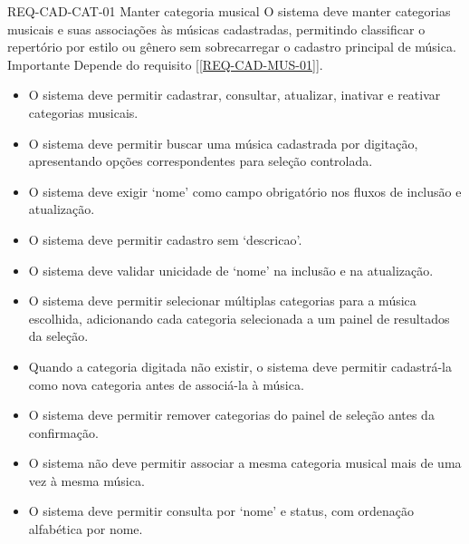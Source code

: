 
\reqfunccad
{REQ-CAD-CAT-01 Manter categoria musical}
{O sistema deve manter categorias musicais e suas associações às músicas cadastradas, permitindo classificar o repertório por estilo ou gênero sem sobrecarregar o cadastro principal de música.}
{Importante}
{Depende do requisito [\ref{REQ-CAD-MUS-01}].}
{\begin{itemize}[leftmargin=0.6cm]
    \item O sistema deve permitir cadastrar, consultar, atualizar, inativar e reativar categorias musicais.
    \item O sistema deve permitir buscar uma música cadastrada por digitação, apresentando opções correspondentes para seleção controlada.
    \item O sistema deve exigir `nome' como campo obrigatório nos fluxos de inclusão e atualização.
    \item O sistema deve permitir cadastro sem `descricao'.
    \item O sistema deve validar unicidade de `nome' na inclusão e na atualização.
    \item O sistema deve permitir selecionar múltiplas categorias para a música escolhida, adicionando cada categoria selecionada a um painel de resultados da seleção.
    \item Quando a categoria digitada não existir, o sistema deve permitir cadastrá-la como nova categoria antes de associá-la à música.
    \item O sistema deve permitir remover categorias do painel de seleção antes da confirmação.
    \item O sistema não deve permitir associar a mesma categoria musical mais de uma vez à mesma música.
    \item O sistema deve permitir consulta por `nome' e status, com ordenação alfabética por nome.
\end{itemize}}


